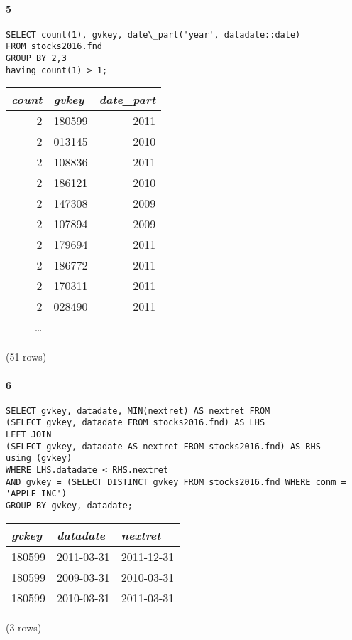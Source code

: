 \documentclass[]{article}
\let\oldparagraph\paragraph
\renewcommand{\paragraph}[1]{\oldparagraph{#1}\mbox{}}
\begin{document}
\paragraph{5} 

\color{blue}
\begin{verbatim}
SELECT count(1), gvkey, date\_part('year', datadate::date)
FROM stocks2016.fnd
GROUP BY 2,3
having count(1) > 1;
\end{verbatim}
\color{black}

\begin{center}
\begin{tabular}{r | l | r}
\textit{count} & \textit{gvkey} & \textit{date\_part} \\
\hline
2 & 180599 & 2011 \\
2 & 013145 & 2010 \\
2 & 108836 & 2011 \\
2 & 186121 & 2010 \\
2 & 147308 & 2009 \\
2 & 107894 & 2009 \\
2 & 179694 & 2011 \\
2 & 186772 & 2011 \\
2 & 170311 & 2011 \\
2 & 028490 & 2011 \\
\ldots\\
\end{tabular}

\noindent (51 rows) \\
\end{center}

\paragraph{6}

\color{blue}
\begin{verbatim}
SELECT gvkey, datadate, MIN(nextret) AS nextret FROM
(SELECT gvkey, datadate FROM stocks2016.fnd) AS LHS
LEFT JOIN
(SELECT gvkey, datadate AS nextret FROM stocks2016.fnd) AS RHS
using (gvkey)
WHERE LHS.datadate < RHS.nextret
AND gvkey = (SELECT DISTINCT gvkey FROM stocks2016.fnd WHERE conm = 'APPLE INC')
GROUP BY gvkey, datadate;
\end{verbatim}
\color{black}

\begin{center}
\begin{tabular}{l | l | l}
\textit{gvkey} & \textit{datadate} & \textit{nextret} \\
\hline
180599 & 2011-03-31 & 2011-12-31 \\
180599 & 2009-03-31 & 2010-03-31 \\
180599 & 2010-03-31 & 2011-03-31 \\
\end{tabular}

\noindent (3 rows) \\
\end{center}
\end{document}
